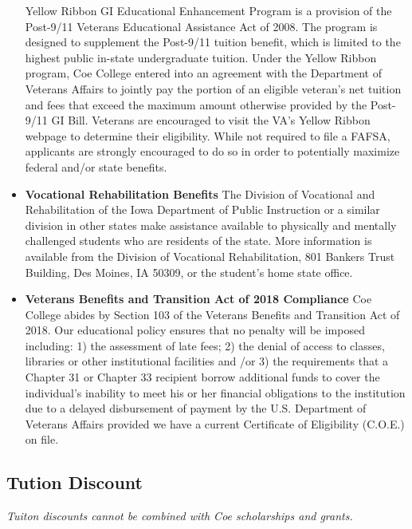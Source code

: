 \documentclass[
  letterpaper,
]{scrbook}
\begin{document}
\begin{itemize}
  Yellow Ribbon GI Educational Enhancement Program is a provision of the
  Post-9/11 Veterans Educational Assistance Act of 2008. The program is
  designed to supplement the Post-9/11 tuition benefit, which is limited
  to the highest public in-state undergraduate tuition. Under the Yellow
  Ribbon program, Coe College entered into an agreement with the
  Department of Veterans Affairs to jointly pay the portion of an
  eligible veteran's net tuition and fees that exceed the maximum amount
  otherwise provided by the Post-9/11 GI Bill. Veterans are encouraged
  to visit the VA's Yellow Ribbon webpage to determine their
  eligibility. While not required to file a FAFSA, applicants are
  strongly encouraged to do so in order to potentially maximize federal
  and/or state benefits.
\item
  \textbf{Vocational Rehabilitation Benefits} The Division of Vocational
  and Rehabilitation of the Iowa Department of Public Instruction or a
  similar division in other states make assistance available to
  physically and mentally challenged students who are residents of the
  state. More information is available from the Division of Vocational
  Rehabilitation, 801 Bankers Trust Building, Des Moines, IA 50309, or
  the student's home state office.
\item
  \textbf{Veterans Benefits and Transition Act of 2018 Compliance} Coe
  College abides by Section 103 of the Veterans Benefits and Transition
  Act of 2018. Our educational policy ensures that no penalty will be
  imposed including: 1) the assessment of late fees; 2) the denial of
  access to classes, libraries or other institutional facilities and /or
  3) the requirements that a Chapter 31 or Chapter 33 recipient borrow
  additional funds to cover the individual's inability to meet his or
  her financial obligations to the institution due to a delayed
  disbursement of payment by the U.S. Department of Veterans Affairs
  provided we have a current Certificate of Eligibility (C.O.E.) on
  file.
\end{itemize}

\subsection{Tution Discount}\label{tution-discount}

\emph{Tuiton discounts cannot be combined with Coe scholarships and
grants.}
\end{document}
